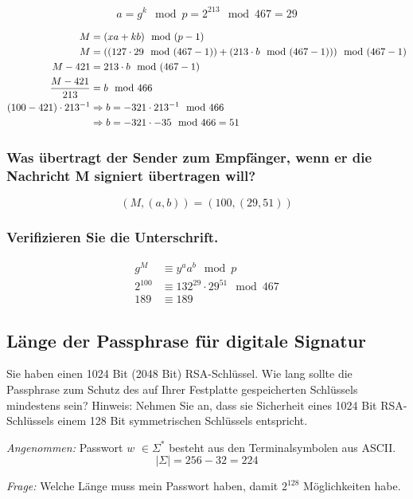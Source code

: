 \[ a = g^k \mod p = 2^213 \mod 467 = 29 \]

\begin{align}
	                 M &= (xa + kb) \mod (p-1) \\
                     M &= ((127\cdot 29 \mod (467-1)) + (213 \cdot b \mod (467-1))) \mod (467-1) \\
               M - 421 &=  213 \cdot b \mod (467-1) \\
	\dfrac{M-421}{213} &= b \mod 466 \\
	(100 - 421) \cdot 213^{-1} &\Rightarrow b = -321\cdot 213^{-1} \mod 466 \\
							   &\Rightarrow b = -321 \cdot -35 \mod 466 = 51	
\end{align}

\subsubsection{Was übertragt der Sender zum Empfänger, wenn er die Nachricht M signiert
übertragen will?}

	\[ (M, (a,b)) = (100, (29,51)) \]

\subsubsection{Verifizieren Sie die Unterschrift.}

\begin{align}
	g^M     &\equiv y^a a^b \mod p 					\\
	2^{100} &\equiv 132^{29} \cdot 29^{51} \mod 467	\\
	189     &\equiv 189		
\end{align}

\subsection{Länge der Passphrase für digitale Signatur}

Sie haben einen 1024 Bit (2048 Bit) RSA-Schlüssel. Wie lang sollte die Passphrase
zum Schutz des auf Ihrer Festplatte gespeicherten Schlüssels mindestens sein?
Hinweis: Nehmen Sie an, dass sie Sicherheit eines 1024 Bit RSA-Schlüssels einem
128 Bit symmetrischen Schlüssels entspricht.

\textit{Angenommen:} Passwort $w$ $\in \Sigma^*$ besteht aus den Terminalsymbolen aus ASCII.
\[|\Sigma| = 256-32 = 224\]

\textit{Frage:} Welche Länge muss mein Passwort haben, damit $2^{128}$ Möglichkeiten habe.

